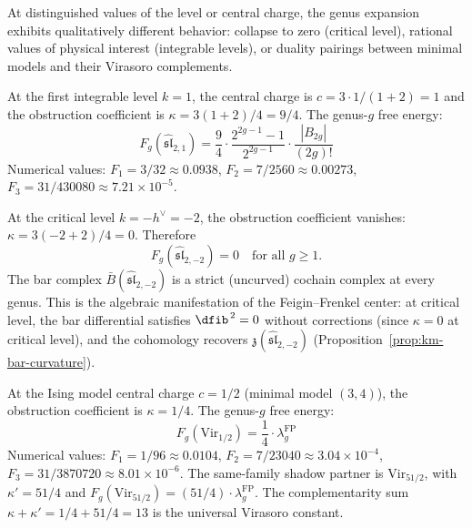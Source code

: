 At distinguished values of the level or central charge, the
genus expansion exhibits qualitatively different behavior:
collapse to zero (critical level), rational values of
physical interest (integrable levels), or duality pairings
between minimal models and their Virasoro complements.

\begin{computation}[\texorpdfstring{$\widehat{\mathfrak{sl}}_2$}{sl-hat_2} at level \texorpdfstring{$k = 1$}{k = 1}]
\label{comp:sl2-k1-genera}
At the first integrable level $k = 1$, the central charge is
$c = 3 \cdot 1/(1+2) = 1$ and the obstruction coefficient
is $\kappa = 3(1+2)/4 = 9/4$.  The genus-$g$ free energy:
\[
F_g(\widehat{\mathfrak{sl}}_{2,1}) = \frac{9}{4}
\cdot \frac{2^{2g-1}-1}{2^{2g-1}} \cdot
\frac{|B_{2g}|}{(2g)!}
\]
Numerical values:
$F_1 = 3/32 \approx 0.0938$,
$F_2 = 7/2560 \approx 0.00273$,
$F_3 = 31/430080 \approx 7.21 \times 10^{-5}$.
\end{computation}

\begin{computation}[\texorpdfstring{$\widehat{\mathfrak{sl}}_2$}{sl-hat_2} at critical
level \texorpdfstring{$k = -2$}{k = -2}]
\label{comp:sl2-critical-genera}
At the critical level $k = -h^\vee = -2$, the obstruction
coefficient vanishes: $\kappa = 3(-2+2)/4 = 0$.  Therefore
\begin{equation}\label{eq:sl2-critical-vanishing}
F_g(\widehat{\mathfrak{sl}}_{2,-2}) = 0
\quad \text{for all } g \geq 1.
\end{equation}
The bar complex $\bar{B}(\widehat{\mathfrak{sl}}_{2,-2})$
is a strict (uncurved) cochain complex at every genus.
This is the algebraic manifestation of the Feigin--Frenkel
center: at critical level, the bar differential satisfies
$\dfib^{\,2} = 0$ without corrections (since $\kappa = 0$ at critical level), and the cohomology recovers
$\mathfrak{z}(\widehat{\mathfrak{sl}}_{2,-2})$
(Proposition~\ref{prop:km-bar-curvature}).
\end{computation}

\begin{computation}[Virasoro at \texorpdfstring{$c = 1/2$}{c = 1/2} (Ising model)]
\label{comp:vir-ising-genera}
At the Ising model central charge $c = 1/2$
(minimal model $(3,4)$), the obstruction coefficient is
$\kappa = 1/4$.  The genus-$g$ free energy:
\begin{equation}\label{eq:ising-Fg}
F_g(\mathrm{Vir}_{1/2}) = \frac{1}{4}
\cdot \lambda_g^{\mathrm{FP}}
\end{equation}
Numerical values:
$F_1 = 1/96 \approx 0.0104$,
$F_2 = 7/23040 \approx 3.04 \times 10^{-4}$,
$F_3 = 31/3870720 \approx 8.01 \times 10^{-6}$.
The same-family shadow partner is $\mathrm{Vir}_{51/2}$, with
$\kappa' = 51/4$ and
$F_g(\mathrm{Vir}_{51/2}) = (51/4) \cdot
\lambda_g^{\mathrm{FP}}$.  The complementarity sum
$\kappa + \kappa' = 1/4 + 51/4 = 13$ is the universal
Virasoro constant.
\end{computation}

